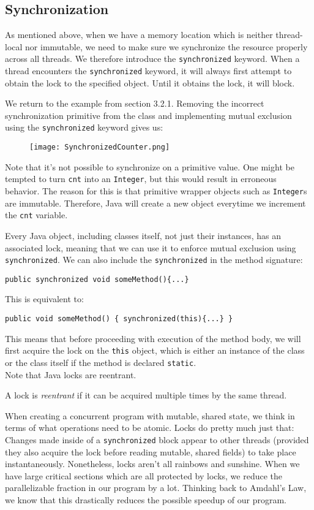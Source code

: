 \documentclass[main]{subfiles}
\begin{document}
\subsection{Synchronization}
As mentioned above, when we have a memory location which is neither thread-local nor immutable, we need to make sure we synchronize the resource properly across all threads. We therefore introduce the \texttt{synchronized} keyword. When a thread encounters the \texttt{synchronized} keyword, it will always first attempt to obtain the lock to the specified object. Until it obtains the lock, it will block.
\begin{example}
    We return to the example from section 3.2.1. Removing the incorrect synchronization primitive from the class and implementing mutual exclusion using the \texttt{synchronized} keyword gives us:
    \begin{figure}[H]
        \centering
        \texttt{[image: SynchronizedCounter.png]}
    \end{figure}
    \noindent Note that it's not possible to synchronize on a primitive value. One might be tempted to turn \texttt{cnt} into an \texttt{Integer}, but this would result in erroneous behavior. The reason for this is that primitive wrapper objects such as \texttt{Integer}s are immutable. Therefore, Java will create a new object everytime we increment the \texttt{cnt} variable.
\end{example}
Every Java object, including classes itself, not just their instances, has an associated lock, meaning that we can use it to enforce mutual exclusion using \texttt{synchronized}. We can also include the \texttt{synchronized} in the method signature:
\begin{center}
    \texttt{public synchronized void someMethod()\{...\}}
\end{center}
This is equivalent to:
\begin{center}
    \texttt{public void someMethod() \{\ synchronized(this)\{...\}\ \}}
\end{center}
This means that before proceeding with execution of the method body, we will first acquire the lock on the \texttt{this} object, which is either an instance of the class or the class itself if the method is declared \texttt{static}.\\[3mm]
Note that Java locks are reentrant.
\begin{definition}
    A lock is \textit{reentrant} if it can be acquired multiple times by the same thread.
\end{definition}
When creating a concurrent program with mutable, shared state, we think in terms of what operations need to be atomic. Locks do pretty much just that: Changes made inside of a \texttt{synchronized} block appear to other threads (provided they also acquire the lock before reading mutable, shared fields) to take place instantaneously. Nonetheless, locks aren't all rainbows and sunshine. When we have large critical sections which are all protected by locks, we reduce the parallelizable fraction in our program by a lot. Thinking back to Amdahl's Law, we know that this drastically reduces the possible speedup of our program.
\end{document}
